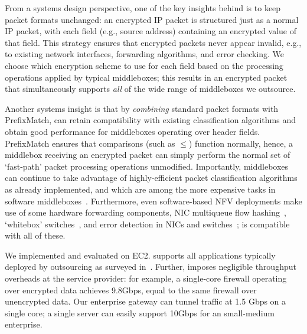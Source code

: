   From a systems design perspective, one of the key insights behind \sys is to keep packet formats unchanged: an encrypted IP packet is structured just as a normal IP packet, with each field (e.g., source address) containing an encrypted value of that field.
  This strategy ensures that encrypted packets never appear invalid, e.g., to existing network interfaces, forwarding algorithms, and error checking. 
  We choose which encryption scheme to use for each field based on the processing operations applied by typical middleboxes; this results in an encrypted packet that simultaneously supports {\it all} of the wide range of middleboxes we outsource.
  
  Another systems insight is that by {\it combining} standard packet formats with PrefixMatch, \sys can retain compatibility with existing classification algorithms and obtain good performance for middleboxes operating over header fields.
  PrefixMatch ensures that comparisons (such as $\leq$) function normally, hence, a middlebox receiving an encrypted packet can simply perform the normal set of `fast-path' packet processing operations unmodified.
  Importantly, middleboxes can continue to take advantage of highly-efficient packet classification algorithms~\cite{packet_classif} as already implemented, and which are among the more expensive tasks in software middleboxes~\cite{comb, ethan-paper}.
  Furthermore, even software-based NFV deployments make use of some hardware forwarding components, \eg{} NIC multiqueue flow hashing~\cite{nicdocument}, `whitebox' switches~\cite{whitebox}, and error detection in NICs and switches~\cite{nicdocument, ciscov6}; \sys is compatible with all of these.
  
 
We implemented and evaluated \sys on EC2. \sys supports all applications typically deployed by outsourcing as surveyed in~\cite{aplomb}.
Further, \sys imposes  negligible throughput overheads at the service provider: for example, a single-core firewall operating over encrypted data achieves 9.8Gbps, equal to the same firewall over unencrypted data.
Our enterprise gateway can tunnel traffic at 1.5 Gbps on a single core;  a single server can easily support 10Gbps for an small-medium enterprise.




